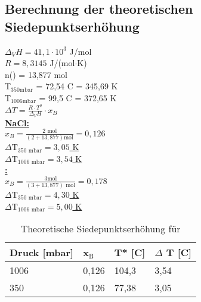 \subsection*{Berechnung der theoretischen Siedepunktserhöhung}
	$\Delta _V H = 41,1 \cdot 10^3$ J/mol \\
	$R = 8,3145$ J/(mol$\cdot$K) \\
	\newline
	n() = 13,877 mol \\
	T$_{350\text{mbar}}$ = 72,54 C = 345,69 K \\
	T$_{1006\text{mbar}}$ = 99,5 C = 372,65 K \\
	\newline
	$\Delta T = \frac{R \cdot T^2}{\Delta _{V}H} \cdot x_{B}$ \\
	\newline
	\newline
	\underline{\textbf{NaCl:}} \\
	\newline
	$x_B = \frac{2 \textrm{ mol}}{(2 + 13,877)\textrm{mol}} = 0,126$\\
	\newline
	\underline{\underline{$\Delta \text{T}_{350 \text{ mbar}} = 3,05$ K}} \\ 
	\newline
	\underline{\underline{$\Delta \text{T}_{1006 \text{ mbar}} = 3,54$ K}} \\
	\newline
	\newline
	\underline{\textbf{:}} \\
	\newline
	$x_B = \frac{3 \textrm{mol}}{(3 + 13,877)\textrm{ mol}} = 0,178$\\
	\newline
	\underline{\underline{$\Delta \text{T}_{350 \text{ mbar}} = 4,30$ K}} \\ 
	\newline
	\underline{\underline{$\Delta \text{T}_{1006 \text{ mbar}} = 5,00$ K}} \\	

	\begin{table}[H]
		\centering
		\label{tab:Siedepunkt_NaCl}
			\begin{tabular}{|l|l|l|l|}
			\hline
			\textbf{Druck [mbar]}	&	\textbf{x$_\text{B}$}	&	\textbf{T* [C]} & \textbf{$\Delta$ T [C]} \\\hline
			1006	&	0,126	&	104,3	&	3,54 \\
			350		&	0,126	&	77,38	&	3,05 \\\hline
			\end{tabular}
			\caption{Theoretische Siedepunktserhöhung für }
	\end{table} 
	
